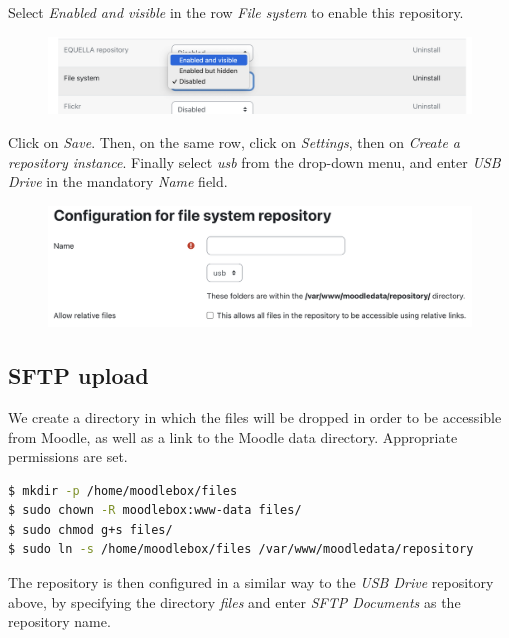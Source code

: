\documentclass[12pt]{article}
\begin{document}
Select \emph{Enabled and visible} in the row \emph{File system} to enable this repository.
\begin{figure}[!ht]
\begin{minipage}[b]{\linewidth}\centering
\includegraphics[width=13cm]{repo-filesystem-usb-1.png}
\end{minipage}
\end{figure}

Click on \emph{Save}.
Then, on the same row, click on \emph{Settings}, then on \emph{Create a repository instance}.
Finally select \emph{usb} from the drop-down menu, and enter \emph{USB Drive} in the mandatory \emph{Name} field.
\begin{figure}[!ht]
\begin{minipage}[b]{\linewidth}\centering
\includegraphics[width=13cm]{repo-filesystem-usb-2.png}
\end{minipage}
\end{figure}

\subsection{SFTP upload}

We create a directory in which the files will be dropped in order to be accessible from Moodle, as well as a link to the Moodle data directory.
Appropriate permissions are set.
\begin{lstlisting}[language=bash]
$ mkdir -p /home/moodlebox/files
$ sudo chown -R moodlebox:www-data files/
$ sudo chmod g+s files/
$ sudo ln -s /home/moodlebox/files /var/www/moodledata/repository
\end{lstlisting}

The repository is then configured in a similar way to the \textsl{USB Drive} repository above, by specifying the directory \emph{files} and enter \emph{SFTP Documents} as the repository name.
\end{document}
